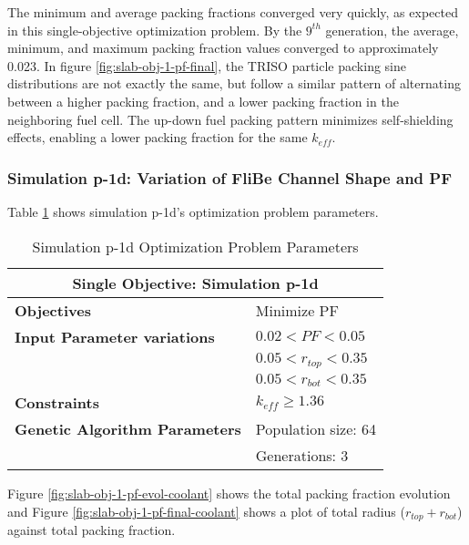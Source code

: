 The minimum and average packing fractions converged very quickly, as expected 
in this single-objective optimization problem.
By the $9^{th}$ generation, the average, minimum, and maximum packing fraction
values converged to approximately 0.023. 
In figure \ref{fig:slab-obj-1-pf-final}, the TRISO particle packing 
sine distributions are not exactly the same, but follow a similar pattern of 
alternating between a higher packing fraction, and a lower packing fraction 
in the neighboring fuel cell. 
The up-down fuel packing pattern minimizes self-shielding effects, enabling  
a lower packing fraction for the same $k_{eff}$. 

\subsubsection{Simulation p-1d: Variation of FliBe Channel Shape and PF}
Table \ref{tab:simulationp1d} shows simulation p-1d's optimization problem parameters. 
\begin{table}[htbp]
    \centering
    \onehalfspacing
    \caption{Simulation p-1d Optimization Problem Parameters}
	\label{tab:simulationp1d}
    \footnotesize
    \begin{tabular}{l|p{4cm}}
    \hline 
    \multicolumn{2}{c}{\textbf{Single Objective: Simulation p-1d}} \\
    \hline 
    \textbf{Objectives} & Minimize PF \\
    \hline 
    \textbf{Input Parameter variations} & $0.02<PF<0.05$ \\
    & $0.05<r_{top}<0.35$ \\
    & $0.05<r_{bot}<0.35$ \\
    \hline
    \textbf{Constraints} & $k_{eff} \geq 1.36$\\ 
    \hline 
    \textbf{Genetic Algorithm Parameters} & Population size: 64 \\
    & Generations: 3 \\
    \hline
    \end{tabular}
\end{table}
Figure \ref{fig:slab-obj-1-pf-evol-coolant} shows the total packing fraction evolution 
and Figure \ref{fig:slab-obj-1-pf-final-coolant} shows a plot of total radius 
($r_{top} + r_{bot}$) against total packing fraction. 
